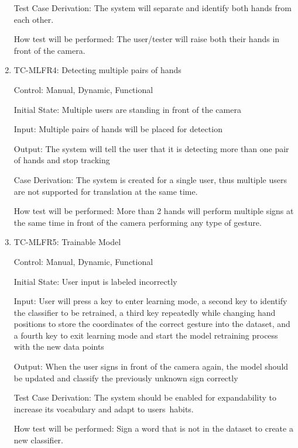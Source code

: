 \documentclass[12pt]{article}
\begin{document}
\begin{enumerate}
Test Case Derivation: The system will separate and identify both hands from each other.
    
How test will be performed: The user/tester will raise both their hands in front of the camera.
  
\item{TC-MLFR4: Detecting multiple pairs of hands\\}
  
Control: Manual, Dynamic, Functional
              
Initial State: Multiple users are standing in front of the camera
              
Input: Multiple pairs of hands will be placed for detection
              
Output: The system will tell the user that it is detecting more than one pair of hands and stop tracking
    
   Case Derivation: The system is created for a single user, thus multiple users are not supported for translation at the same time.
    
How test will be performed: More than 2 hands will perform multiple signs at the same time in front of the camera performing any type of gesture.
  
\item{TC-MLFR5: Trainable Model\\}
  
Control: Manual, Dynamic, Functional
              
Initial State: User input is labeled incorrectly
              
Input: User will press a key to enter learning mode, a second key to identify the classifier to be retrained, a third key repeatedly while changing hand positions to store the coordinates of the correct gesture into the dataset, and a fourth key to exit learning mode and start the model retraining process with the new data points
              
Output: When the user signs in front of the camera again, the model should be updated and classify the previously unknown sign correctly
    
Test Case Derivation: The system should be enabled for expandability to increase its vocabulary and adapt to users\textquotesingle \ habits.
    
How test will be performed: Sign a word that is not in the dataset to create a new classifier.
  
\end{enumerate}
  
\end{document}
